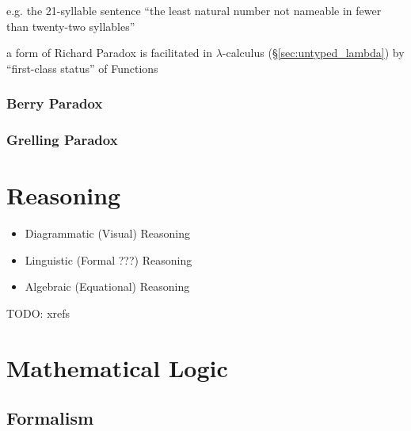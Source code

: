 e.g. the 21-syllable sentence ``the least natural number not nameable
in fewer than twenty-two syllables''

a form of Richard Paradox is facilitated in $\lambda$-calculus
(\S\ref{sec:untyped_lambda}) by ``first-class status'' of Functions



\subsubsection{Berry Paradox}\label{sec:berry_paradox}

\subsubsection{Grelling Paradox}\label{sec:grelling_paradox}



\section{Reasoning}\label{sec:reasoning}

\begin{itemize}
  \item Diagrammatic (Visual) Reasoning
  \item Linguistic (Formal ???) Reasoning
  \item Algebraic (Equational) Reasoning
\end{itemize}

TODO: xrefs



\section{Mathematical Logic}\label{sec:mathematical_logic}
\cite{curry77}

\subsection{Formalism}\label{sec:formalism}

